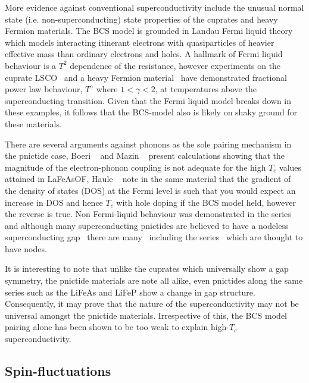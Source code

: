 More evidence against conventional superconductivity include the unusual normal state (i.e. non-superconducting) state properties of the cuprates and heavy Fermion materials. The \ac{BCS} model is grounded in Landau Fermi liquid theory which models interacting itinerant electrons with quasiparticles of heavier effective mass than ordinary electrons and holes. A hallmark of Fermi liquid behaviour is a $T^2$ dependence of the resistance, however experiments on the cuprate \ac{LSCO}~\cite{Cooper2009} and a heavy Fermion material~\cite{Custers2003} have demonstrated fractional power law behaviour, $T^\gamma$ where $1 < \gamma < 2$, at temperatures above the superconducting transition. Given that the Fermi liquid model breaks down in these examples, it follows that the \ac{BCS}-model also is likely on shaky ground for these materials.

There are several arguments against phonons as the sole pairing mechanism in the pnictide case, Boeri \etal~\cite{Boeri2008} and Mazin \etal~\cite{Mazin2008} present calculations showing that the magnitude of the electron-phonon coupling is not adequate for the high $T_c$ values attained in LaFeAsOF, Haule \etal~\cite{Haule2008} note in the same material that the gradient of the density of states (DOS) at the Fermi level is such that you would expect an increase in DOS and hence $T_c$ with hole doping if the \ac{BCS} model held, however the reverse is true. Non Fermi-liquid behaviour was demonstrated in the \BaFeAsP{} series~\cite{Jiang2009,Kasahara2010} and although many superconducting pnictides are believed to have a nodeless superconducting gap~\cite{Hashimoto2012,Zhang2011a,Ding2008, Terashima2009} there are many~\cite{Fletcher2009, Qiu2011a, Song2011, Dong2010, Hashimoto2012} including the \BaFeAsP{} series~\cite{Zhang2011,Yamashita2011a,Suzuki2011} which are thought to have nodes.

It is interesting to note that unlike the cuprates which universally show a \DxTwoyTwo{} gap symmetry, the pnictide materials are note all alike, even pnictides along the same series such as the LiFeAs and LiFeP show a change in gap structure. Consequently, it may prove that the nature of the superconductivity may not be universal amongst the pnictide materials. Irrespective of this, the \ac{BCS} model pairing alone has been shown to be too weak to explain high-$T_c$ superconductivity.


\subsection{Spin-fluctuations}

